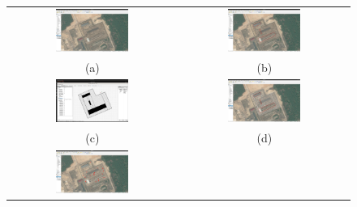 \begin{figure}[h]
    \centering
    \begin{tabular}{cc}
        \includegraphics[width=0.45\textwidth]{figs/Jihwan/eg1.png} &
        \includegraphics[width=0.45\textwidth]{figs/Jihwan/eg2.png} \\
        (a) & (b) \\[10pt]
        \includegraphics[width=0.45\textwidth]{figs/Jihwan/eg3.png} &
        \includegraphics[width=0.45\textwidth]{figs/Jihwan/eg4.png} \\
        (c) & (d) \\[10pt]
        \includegraphics[width=0.45\textwidth]{figs/Jihwan/eg5.png} &

\end{tabular}
\end{figure}
